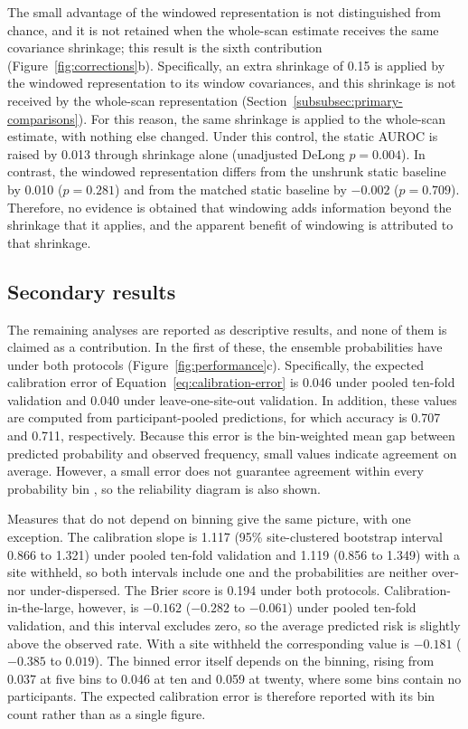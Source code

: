 The small advantage of the windowed representation is not distinguished from chance, and it
is not retained when the whole-scan estimate receives the same covariance shrinkage; this
result is the sixth contribution (Figure~\ref{fig:corrections}b). Specifically, an extra shrinkage of 0.15 is applied by
the windowed representation to its window covariances, and this shrinkage is not received
by the whole-scan representation (Section~\ref{subsubsec:primary-comparisons}). For this reason, the same
shrinkage is applied to the whole-scan estimate, with nothing else changed. Under this
control, the static AUROC is raised by 0.013 through shrinkage alone (unadjusted DeLong
$p=0.004$). In contrast, the windowed representation differs from the unshrunk static
baseline by 0.010 ($p=0.281$) and from the matched static baseline by $-0.002$
($p=0.709$). Therefore, no evidence is obtained that windowing adds information beyond the
shrinkage that it applies, and the apparent benefit of windowing is attributed to that
shrinkage.

\subsection{Secondary results}
\label{subsec:results-secondary}

The remaining analyses are reported as descriptive results, and none of them is claimed as
a contribution. In the first of these, the ensemble probabilities have 
under both protocols (Figure~\ref{fig:performance}c). Specifically, the
expected calibration error of Equation~\eqref{eq:calibration-error} is 0.046 under pooled ten-fold
validation and 0.040 under leave-one-site-out validation. In addition, these values are
computed from participant-pooled predictions, for which accuracy is 0.707 and 0.711,
respectively. Because this error is the bin-weighted mean gap between predicted probability
and observed frequency, small values indicate agreement on average. However, a small error
does not guarantee agreement within every probability bin , so the reliability diagram is
also shown.

Measures that do not depend on binning give the same picture, with one exception. The
calibration slope is 1.117 (95\% site-clustered bootstrap interval 0.866 to 1.321) under
pooled ten-fold validation and 1.119 (0.856 to 1.349) with a site withheld, so both intervals
include one and the probabilities are neither over- nor under-dispersed. The Brier score is
0.194 under both protocols. Calibration-in-the-large, however, is $-0.162$ ($-0.282$ to
$-0.061$) under pooled ten-fold validation, and this interval excludes zero, so the average
predicted risk is slightly above the observed rate. With a site withheld the corresponding
value is $-0.181$ ($-0.385$ to $0.019$). The binned error itself depends on the binning,
rising from 0.037 at five bins to 0.046 at ten and 0.059 at twenty, where some bins contain no
participants. The expected calibration error is therefore reported with its bin count rather
than as a single figure.

